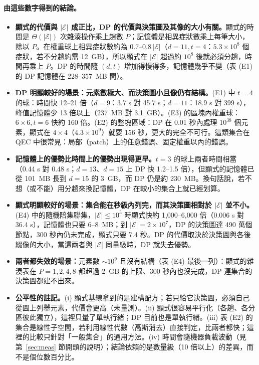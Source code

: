 \documentclass[a4paper,11pt,fontset=none]{ctexart}
\newcommand{\E}{\mathcal{E}}
\theoremstyle{definition}
\begin{document}
\paragraph{由這些數字得到的結論。}
\begin{itemize}[leftmargin=1.5em]
\item \textbf{顯式的代價與 $\lvert\E\rvert$ 成正比，DP 的代價與決策圖及其像的大小有關。}顯式的時間是 $\Theta(\lvert\E\rvert)$ 次雜湊操作乘上趟數 $P$；記憶體是相異症狀數乘上每筆大小，除以 $P$。在權重球上相異症狀數約為 $0.7$--$0.8\,\lvert\E\rvert$（$d{=}11,t{=}4$：$5.3\times10^8$ 個症狀，若不分趟約需 12~GB），所以顯式在 $\lvert\E\rvert$ 超過約 $10^8$ 後就必須分趟，時間再乘上 $P$。DP 的時間隨 $(d,t)$ 增加得慢得多，記憶體幾乎不變（表 (E1) 的 DP 記憶體在 228--357~MB 間）。
\item \textbf{DP 明顯較好的場景：元素數極大、而決策圖小且像仍有結構。}(E1) 中 $t=4$ 的球：時間快 12--21 倍（$d{=}9$：3.7 s 對 45.7 s；$d{=}11$：18.9 s 對 399 s），峰值記憶體少 13 倍以上（237~MB 對 3.1~GB）。(E3) 的區塊內權重球：$6\times6,t{=}6$ 快約 160 倍。(E2) 的整塊區域：DP 在 0.01 秒內處理 $10^{38}$ 個元素，顯式在 $4\times4$（$4.3\times10^9$）就要 156 秒，更大的完全不可行。這類集合在 QEC 中很常見：局部（patch）上的任意錯誤、固定權重以內的錯誤。
\item \textbf{記憶體上的優勢比時間上的優勢出現得更早。}$t=3$ 的球上兩者時間相當（0.44 s 對 0.48 s；$d{=}13$、$d{=}15$ 上 DP 快 1.2--1.5 倍），但顯式的記憶體已從 101~MB 長到 $d{=}15$ 的 3~GB，而 DP 仍是約 230~MB。換句話說，若不想（或不能）用分趟來換記憶體，DP 在較小的集合上就已經划算。
\item \textbf{顯式明顯較好的場景：集合能在秒級內列完，而其決策圖相對於 $\lvert\E\rvert$ 並不小。}(E4) 中的隨機陪集聯集，$\lvert\E\rvert\le10^5$ 時顯式快約 1,000--6,000 倍（0.006 s 對 36.4 s），記憶體也只要 6--8~MB；到 $\lvert\E\rvert=2\times10^7$，DP 的決策圖達 490 萬個節點，300 秒內仍未完成，顯式只要 7.4 秒。DP 的代價取決於決策圖與各後綴像的大小，當這兩者與 $\lvert\E\rvert$ 同量級時，DP 就失去優勢。
\item \textbf{兩者都失效的場景：}元素數 $\sim10^9$ 且沒有結構（表 (E4) 最後一列）：顯式的雜湊表在 $P=1,2,4,8$ 都超過 2~GB 的上限、300 秒內也沒完成，DP 連集合的決策圖都建不出來。
\item \textbf{公平性的註記。}(i) 顯式基線拿到的是建構配方；若只給它決策圖，必須自己從圖上列舉元素，代價會更高（未量測）。(ii) 顯式很容易平行化（各趟、各分區彼此獨立），這裡只量了單執行緒；DP 目前也是單執行緒。(iii) 表 (E2) 的集合是線性子空間，若利用線性代數（高斯消去）直接判定，比兩者都快；這裡的比較只針對「一般集合」的通用方法。(iv) 時間會隨機器負載波動（見第~\ref{sec:meas} 節開頭的說明）；結論依賴的是數量級（10 倍以上）的差異，而不是個位數百分比。
\end{itemize}
\end{document}
